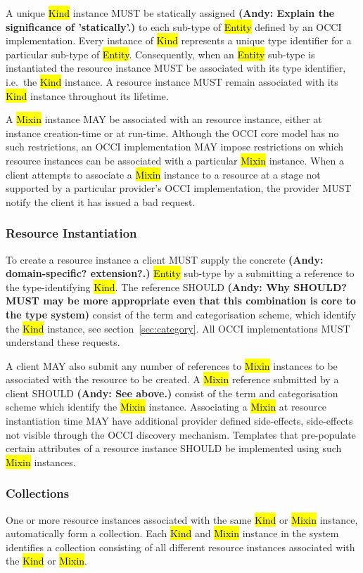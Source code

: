 \documentclass[10pt,a4paper]{article}
\begin{document}
A unique \hl{Kind} instance MUST be statically assigned \textbf{(Andy: Explain the significance of 'statically'.)} 
to each sub-type of
\hl{Entity} defined by an OCCI implementation. Every instance of \hl{Kind}
represents a unique type identifier for a particular sub-type of \hl{Entity}.
Consequently, when an \hl{Entity} sub-type is instantiated the resource instance
MUST be associated with its type identifier, i.e.~the \hl{Kind} instance.
A resource instance MUST remain associated with its \hl{Kind} instance throughout
its lifetime.

A \hl{Mixin} instance MAY be associated with an resource instance, either at
instance creation-time or at run-time. Although the OCCI core model has no such
restrictions, an OCCI implementation MAY impose restrictions on which resource
instances can be associated with a particular \hl{Mixin} instance.
%
When a client attempts to associate a \hl{Mixin} instance to a resource at a
stage not supported by a particular provider's OCCI implementation, the
provider MUST notify the client it has issued a bad request.

\subsubsection{Resource Instantiation}
\label{sec:instantiation}
To create a resource instance a client MUST supply the concrete \textbf{(Andy: domain-specific? extension?.)} 
\hl{Entity} sub-type by a submitting a reference to the type-identifying \hl{Kind}. The
reference SHOULD \textbf{(Andy: Why SHOULD? MUST may be more 
appropriate even that this combination is core to the type system)} consist of the term 
and categorisation scheme, which
identify the \hl{Kind} instance, see section~\ref{sec:category}.
All OCCI implementations MUST understand these requests.

A client MAY also submit any number of references to \hl{Mixin} instances to be
associated with the resource to be created. A \hl{Mixin} reference submitted by
a client SHOULD \textbf{(Andy: See above.)} consist of the term and categorisation scheme which identify
the \hl{Mixin} instance. 
Associating a \hl{Mixin} at resource
instantiation time MAY have additional provider defined side-effects,
side-effects not visible through the OCCI discovery mechanism. Templates that
pre-populate certain attributes of a resource instance SHOULD be implemented
using such \hl{Mixin} instances.

\subsubsection{Collections}
\label{sec:collection}
One or more resource instances associated with the same \hl{Kind} or \hl{Mixin}
instance, automatically form a collection.
Each \hl{Kind} and \hl{Mixin} instance in the system identifies a collection
consisting of all different resource instances associated with the \hl{Kind} or
\hl{Mixin}.
\end{document}

